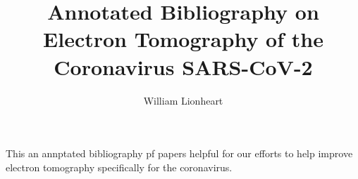 \documentclass[12pt]{article}
\title{Annotated Bibliography on Electron Tomography of the Coronavirus SARS-CoV-2}
\author{William Lionheart}
\begin{document}
		\maketitle


This an annptated bibliography pf papers helpful for our efforts to help improve electron tomography specifically for the coronavirus.
\nocite{*}



\end{document}
